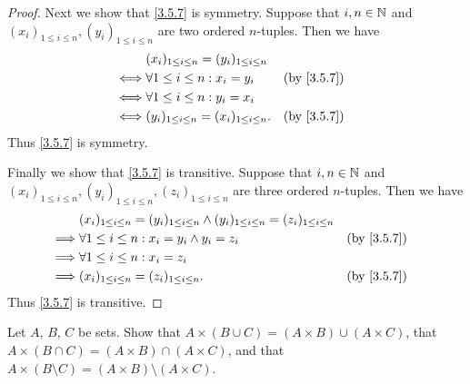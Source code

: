 \begin{proof}
  Next we show that \cref{3.5.7} is symmetry.
  Suppose that \(i, n \in \mathbb{N}\) and \((x_i)_{1 \leq i \leq n}, (y_i)_{1 \leq i \leq n}\) are two ordered \(n\)-tuples.
  Then we have
  \begin{align*}
         & (x_i)_{1 \leq i \leq n} = (y_i)_{1 \leq i \leq n}                                \\
    \iff & \forall 1 \leq i \leq n : x_i = y_i                &  & \text{(by \cref{3.5.7})} \\
    \iff & \forall 1 \leq i \leq n : y_i = x_i                                              \\
    \iff & (y_i)_{1 \leq i \leq n} = (x_i)_{1 \leq i \leq n}. &  & \text{(by \cref{3.5.7})}
  \end{align*}
  Thus \cref{3.5.7} is symmetry.

  Finally we show that \cref{3.5.7} is transitive.
  Suppose that \(i, n \in \mathbb{N}\) and \((x_i)_{1 \leq i \leq n}, (y_i)_{1 \leq i \leq n}, (z_i)_{1 \leq i \leq n}\) are three ordered \(n\)-tuples.
  Then we have
  \begin{align*}
             & (x_i)_{1 \leq i \leq n} = (y_i)_{1 \leq i \leq n} \land (y_i)_{1 \leq i \leq n} = (z_i)_{1 \leq i \leq n}                               \\
    \implies & \forall 1 \leq i \leq n : x_i = y_i \land y_i = z_i                                                       &  & \text{(by \cref{3.5.7})} \\
    \implies & \forall 1 \leq i \leq n : x_i = z_i                                                                                                     \\
    \implies & (x_i)_{1 \leq i \leq n} = (z_i)_{1 \leq i \leq n}.                                                        &  & \text{(by \cref{3.5.7})}
  \end{align*}
  Thus \cref{3.5.7} is transitive.
\end{proof}

\begin{ex}\label{ex:3.5.4}
  Let \(A\), \(B\), \(C\) be sets.
  Show that \(A \times (B \cup C) = (A \times B) \cup (A \times C)\), that \(A \times (B \cap C) = (A \times B) \cap (A \times C)\), and that \(A \times (B \setminus C) = (A \times B) \setminus (A \times C)\).
\end{ex}

